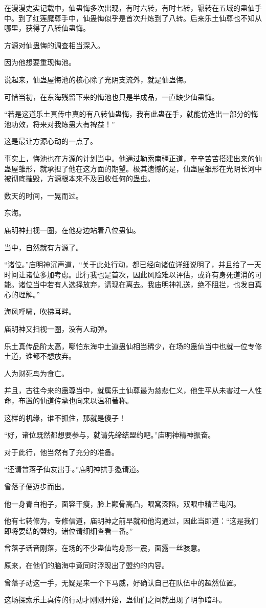 \begin{this_body}
在漫漫史实记载中，仙蛊悔多次出现，有时六转，有时七转，辗转在五域的蛊仙手中。到了红莲魔尊手中，仙蛊悔似乎是首次升炼到了八转。后来乐土仙尊也不知从哪里，获得了八转仙蛊悔。

方源对仙蛊悔的调查相当深入。

因为他想要重现悔池。

说起来，仙蛊屋悔池的核心除了光阴支流外，就是仙蛊悔。

可惜当初，在东海残留下来的悔池也只是半成品，一直缺少仙蛊悔。

“若是这道乐土真传中真的有八转仙蛊悔，我有此蛊在手，就能仿造出一部分的悔池功效，将来对我炼蛊大有裨益！”

这是最让方源心动的一点了。

事实上，悔池也在方源的计划当中。他通过勒索南疆正道，辛辛苦苦搭建出来的仙蛊屋雏形，就承担了他在这方面的期望。极其遗憾的是，仙蛊屋雏形在光阴长河中被彻底摧毁，方源根本来不及回收任何的蛊虫。

数天的时间，一晃而过。

东海。

庙明神扫视一圈，在他身边站着八位蛊仙。

当中，自然就有方源了。

“诸位。”庙明神沉声道，“关于此处行动，都已经向诸位详细说明了，并且给了一天时间让诸位多加考虑。此行我也是首次，因此风险难以评估，或许有身死道消的可能。诸位当中若有人选择放弃，请现在离去。我庙明神礼送，绝不阻拦，也发自真心的理解。”

海风呼啸，吹拂耳畔。

庙明神又扫视一圈，没有人动弹。

乐土真传品阶太高，哪怕东海中土道蛊仙相当稀少，在场的蛊仙当中也就一位专修土道，谁都不想放弃。

人为财死鸟为食亡。

并且，古往今来的蛊尊当中，就属乐土仙尊最为慈悲仁义，他生平从未害过一人性命，布置的仙道传承也向来以温和著称。

这样的机缘，谁不抓住，那就是傻子！

“好，诸位既然都想要参与，就请先缔结盟约吧。”庙明神精神振奋。

对于此行，他当然有了充分的准备。

“还请曾落子仙友出手。”庙明神拱手邀请道。

曾落子便迈步而出。

他一身青白袍子，面容干瘦，脸上颧骨高凸，眼窝深陷，双眼中精芒电闪。

他有七转修为，专修信道，庙明神之前早就和他沟通过，因此当即道：“这是我们即将要结的盟约，诸位请细细查看一番。”

曾落子话音刚落，在场的不少蛊仙均身形一震，面露一丝骇意。

原来，在他们的脑海中竟同时浮现出了盟约的内容。

曾落子动这一手，无疑是来一个下马威，好确认自己在队伍中的超然位置。

这场探索乐土真传的行动才刚刚开始，蛊仙们之间就出现了明争暗斗。

\end{this_body}

